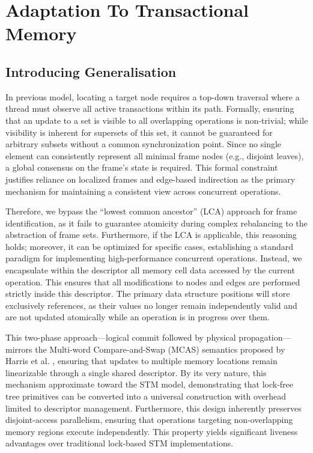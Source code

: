 \section{Adaptation To Transactional Memory}
\label{sec:adaptation_to_transactional_memory}

\subsection{Introducing Generalisation}

In previous model, locating a target node requires a top-down traversal where a thread must observe all active transactions within its path. Formally, ensuring that an update to a set is visible to all overlapping operations is non-trivial; while visibility is inherent for supersets of this set, it cannot be guaranteed for arbitrary subsets without a common synchronization point. Since no single element can consistently represent all minimal frame nodes (e.g., disjoint leaves), a global consensus on the frame's state is required. This formal constraint justifies reliance on localized frames and edge-based indirection as the primary mechanism for maintaining a consistent view across concurrent operations.

Therefore, we bypass the ``lowest common ancestor'' (LCA) approach for frame identification, as it fails to guarantee atomicity during complex rebalancing to the abstraction of frame sets. Furthermore, if the LCA is applicable, this reasoning holds; moreover, it can be optimized for specific cases, establishing a standard paradigm for implementing high-performance concurrent operations. Instead, we encapsulate within the descriptor all memory cell data accessed by the current operation. This ensures that all modifications to nodes and edges are performed strictly inside this descriptor. The primary data structure positions will store exclusively references, as their values no longer remain independently valid and are not updated atomically while an operation is in progress over them.

This two-phase approach—logical commit followed by physical propagation—mirrors the Multi-word Compare-and-Swap (MCAS) semantics proposed by Harris et al. \cite{PracticalMCAS}, ensuring that updates to multiple memory locations remain linearizable through a single shared descriptor. By its very nature, this mechanism approximate toward the STM model, demonstrating that lock-free tree primitives can be converted into a universal construction with overhead limited to descriptor management. Furthermore, this design inherently preserves disjoint-access parallelism, ensuring that operations targeting non-overlapping memory regions execute independently. This property yields significant liveness advantages over traditional lock-based STM implementations.

